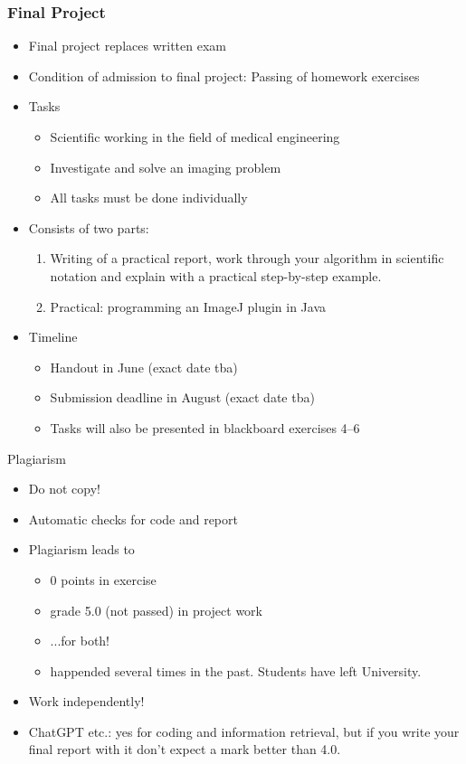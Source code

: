 \begin{frame}
	\frametitle{Final Project}
	\begin{itemize}
		\item Final project replaces written exam
		\item Condition of admission to final project: Passing of homework exercises
		\item Tasks
		\begin{itemize}
			\item Scientific working in the field of medical engineering
			\item Investigate and solve an imaging problem
			\item All tasks must be done individually
		\end{itemize}
		\item Consists of two parts:
		\begin{enumerate}
			\item Writing of a practical report, work through your algorithm in scientific notation and explain with a practical step-by-step example.
			\item Practical: programming an ImageJ plugin in Java
		\end{enumerate}
		\item Timeline
		\begin{itemize}
			\item Handout in June (exact date tba)
			\item Submission deadline in August (exact date tba)
			\item Tasks will also be presented in blackboard exercises 4--6
		\end{itemize}
	\end{itemize}
\end{frame}

\begin{frame}[c]{Plagiarism}
	\begin{itemize}
		\setlength\itemsep{0.4cm}
		\item Do not copy!
		\item Automatic checks for code and report
		\item Plagiarism leads to
		\begin{itemize}
			\item 0 points in exercise
			\item grade 5.0 (not passed) in project work
			\item ...for both!
			\item happended several times in the past. Students have left University. 
		\end{itemize}
		\item Work independently!
		\item ChatGPT etc.: yes for coding and information retrieval, but if you write your final report with it don't expect a mark better than 4.0.
	\end{itemize}
\end{frame}



